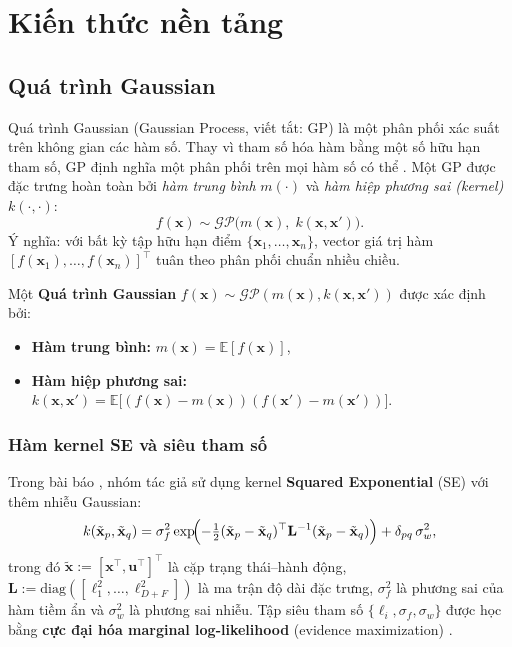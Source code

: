 \section{Kiến thức nền tảng}
\label{SEC_background}

\subsection{Quá trình Gaussian}
\label{SUB_SEC_GP}

Quá trình Gaussian (Gaussian Process, viết tắt: GP) là một phân phối xác suất trên không gian các hàm số. Thay vì tham số hóa hàm bằng một số hữu hạn tham số, GP định nghĩa một phân phối trên mọi hàm số có thể \cite{Rasmussen_Williams_2006}. Một GP được đặc trưng hoàn toàn bởi \textit{hàm trung bình} $m(\cdot)$ và \textit{hàm hiệp phương sai (kernel)} $k(\cdot, \cdot)$:
\begin{equation}
    f(\mathbf{x}) \sim \mathcal{GP}\bigl(m(\mathbf{x}),\; k(\mathbf{x}, \mathbf{x}')\bigr).
    \label{gp_dinh_nghia}
\end{equation}
Ý nghĩa: với bất kỳ tập hữu hạn điểm $\{\mathbf{x}_1, \dots, \mathbf{x}_n\}$, vector giá trị hàm $[f(\mathbf{x}_1), \dots, f(\mathbf{x}_n)]^\top$ tuân theo phân phối chuẩn nhiều chiều.

\begin{dn}
\label{DN_GP}
    Một \textbf{Quá trình Gaussian} $f(\mathbf{x}) \sim \mathcal{GP}(m(\mathbf{x}), k(\mathbf{x}, \mathbf{x}'))$ được xác định bởi:
    \begin{itemize}
        \item \textbf{Hàm trung bình:} $m(\mathbf{x}) = \mathbb{E}[f(\mathbf{x})]$,
        \item \textbf{Hàm hiệp phương sai:} $k(\mathbf{x}, \mathbf{x}') = \mathbb{E}\bigl[(f(\mathbf{x}) - m(\mathbf{x}))(f(\mathbf{x}') - m(\mathbf{x}'))\bigr]$.
    \end{itemize}
\end{dn}

\subsubsection{Hàm kernel SE và siêu tham số}
\label{SUB_SUB_SEC_kernel}

Trong bài báo \cite{Deisenroth_2015}, nhóm tác giả sử dụng kernel \textbf{Squared Exponential} (SE) với thêm nhiễu Gaussian:
\begin{equation}
    k(\tilde{\mathbf{x}}_p, \tilde{\mathbf{x}}_q) = \sigma_f^2 \exp\!\Bigl(-\tfrac{1}{2}(\tilde{\mathbf{x}}_p - \tilde{\mathbf{x}}_q)^\top \mathbf{L}^{-1} (\tilde{\mathbf{x}}_p - \tilde{\mathbf{x}}_q)\Bigr) + \delta_{pq}\,\sigma_w^2,
    \label{kernel_SE}
\end{equation}
trong đó $\tilde{\mathbf{x}} := [\mathbf{x}^\top, \mathbf{u}^\top]^\top$ là cặp trạng thái--hành động, $\mathbf{L} := \mathrm{diag}([\ell_1^2, \dots, \ell_{D+F}^2])$ là ma trận độ dài đặc trưng, $\sigma_f^2$ là phương sai của hàm tiềm ẩn và $\sigma_w^2$ là phương sai nhiễu. Tập siêu tham số $\{\ell_i, \sigma_f, \sigma_w\}$ được học bằng \textbf{cực đại hóa marginal log-likelihood} (evidence maximization) \cite{Rasmussen_Williams_2006,MacKay_2003}.
\medskip

